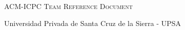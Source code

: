 \documentclass[letterpaper]{article} %
\begin{document}
  \thispagestyle{fancy}
  
  \begin{center}
    \Huge\textsc{ACM-ICPC Team Reference Document}

    \huge Universidad Privada de Santa Cruz de la Sierra - UPSA

    \vspace{0.50cm}
  \end{center}
  
  \begin{multicols*}{2}
    \tableofcontents
  \end{multicols*}
  
  \enlargethispage*{\baselineskip}
  \pagebreak
  
  
  \setcounter{page}{1}
  
  \begin{multicols*}{2}
    
  \end{multicols*}
\end{document}
